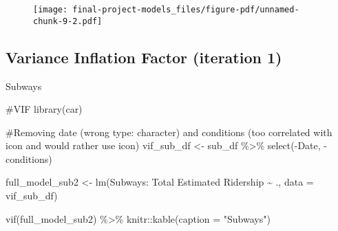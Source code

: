 \documentclass[
  letterpaper,
  DIV=11,
  numbers=noendperiod]{scrartcl}
\newenvironment{Shaded}{\begin{snugshade}}{\end{snugshade}}
\newcommand{\AttributeTok}[1]{\textcolor[rgb]{0.40,0.45,0.13}{#1}}
\newcommand{\CommentTok}[1]{\textcolor[rgb]{0.37,0.37,0.37}{#1}}
\newcommand{\FunctionTok}[1]{\textcolor[rgb]{0.28,0.35,0.67}{#1}}
\newcommand{\NormalTok}[1]{\textcolor[rgb]{0.00,0.23,0.31}{#1}}
\newcommand{\OtherTok}[1]{\textcolor[rgb]{0.00,0.23,0.31}{#1}}
\newcommand{\SpecialCharTok}[1]{\textcolor[rgb]{0.37,0.37,0.37}{#1}}
\newcommand{\StringTok}[1]{\textcolor[rgb]{0.13,0.47,0.30}{#1}}
\begin{document}
\begin{figure}[H]

{\centering \texttt{[image: final-project-models\_files/figure-pdf/unnamed-chunk-9-2.pdf]}

}

\end{figure}

\hypertarget{variance-inflation-factor-iteration-1}{%
\subsection{Variance Inflation Factor (iteration
1)}\label{variance-inflation-factor-iteration-1}}

Subways

\begin{Shaded}
\begin{Highlighting}[]
\CommentTok{\#VIF}
\FunctionTok{library}\NormalTok{(car)}

\CommentTok{\#Removing date (wrong type: character) and conditions (too correlated with icon and would rather use icon)}
\NormalTok{vif\_sub\_df }\OtherTok{\textless{}{-}}  
\NormalTok{  sub\_df }\SpecialCharTok{\%\textgreater{}\%}
  \FunctionTok{select}\NormalTok{(}\SpecialCharTok{{-}}\NormalTok{Date,}
         \SpecialCharTok{{-}}\NormalTok{conditions)}


\NormalTok{full\_model\_sub2 }\OtherTok{\textless{}{-}} \FunctionTok{lm}\NormalTok{(}\StringTok{\textasciigrave{}}\AttributeTok{Subways: Total Estimated Ridership}\StringTok{\textasciigrave{}} \SpecialCharTok{\textasciitilde{}}\NormalTok{ ., }\AttributeTok{data =}\NormalTok{ vif\_sub\_df)}


\FunctionTok{vif}\NormalTok{(full\_model\_sub2) }\SpecialCharTok{\%\textgreater{}\%}\NormalTok{ knitr}\SpecialCharTok{::}\FunctionTok{kable}\NormalTok{(}\AttributeTok{caption =} \StringTok{"Subways"}\NormalTok{)}
\end{Highlighting}
\end{Shaded}
\end{document}
